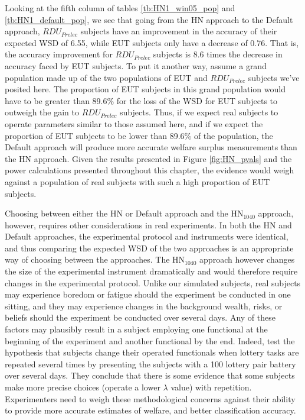 \documentclass[../main.tex]{subfiles}
\begin{document}
Looking at the fifth column of tables \ref{tb:HN1_win05_pop} and \ref{tb:HN1_default_pop}, we see that going from the HN approach to the Default approach, $\mathit{RDU_{Prelec}}$ subjects have an improvement in the accuracy of their expected WSD of 6.55, while EUT subjects only have a decrease of 0.76.
That is, the accuracy improvement for $\mathit{RDU_{Prelec}}$ subjects is 8.6 times the decrease in accuracy faced by EUT subjects.
To put it another way, assume a grand population made up of the two populations of EUT and $\mathit{RDU_{Prelec}}$ subjects we've posited here.
The proportion of EUT subjects in this grand population would have to be greater than 89.6\% for the loss of the WSD for EUT subjects to outweigh the gain to $\mathit{RDU_{Prelec}}$ subjects.{\footnotemark}
Thus, if we expect real subjects to operate parameters similar to those assumed here, and if we expect the proportion of EUT subjects to be lower than  89.6\% of the population, the Default approach will produce more accurate welfare surplus measurements than the HN approach.
Given the results presented in Figure \ref{fig:HN_pvals} and the power calculations presented throughout this chapter, the evidence would weigh against a population of real subjects with such a high proportion of EUT subjects.

\addtocounter{footnote}{-1}

Choosing between either the HN or Default approach and the $\text{HN}_{1040}$ approach, however, requires other considerations in real experiments.
In both the HN and Default approaches, the experimental protocol and instruments were identical, and thus comparing the expected WSD of the two approaches is an appropriate way of choosing between the approaches.
The $\text{HN}_{1040}$ approach however changes the size of the experimental instrument dramatically and would therefore require changes in the experimental protocol.
Unlike our simulated subjects, real subjects may experience boredom or fatigue should the experiment be conducted in one sitting, and they may experience changes in the background wealth, risks, or beliefs should the experiment be conducted over several days.
Any of these factors may plausibly result in a subject employing one functional at the beginning of the experiment and another functional by the end.
Indeed, \textcite{Hey2001} test the hypothesis that subjects change their operated functionals when lottery tasks are repeated several times by presenting the subjects with a 100 lottery pair battery over several days.
They conclude that there is some evidence that some subjects make more precise choices (operate a lower $\lambda$ value) with repetition.
Experimenters need to weigh these methodological concerns against their ability to provide more accurate estimates of welfare, and better classification accuracy.
\end{document}
